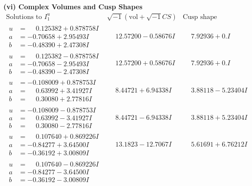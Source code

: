 \documentclass[1p]{elsarticle_modified}
\theoremstyle{definition}
\newcommand{\I}{\sqrt{-1}}
\begin{document}
\newpage\flushleft \textbf{(vi) Complex Volumes and Cusp Shapes}
$$\begin{array}{c|c|c}  
\text{Solutions to }I^u_{1}& \I (\text{vol} + \sqrt{-1}CS) & \text{Cusp shape}\\
 \hline 
\begin{aligned}
u &= \phantom{-}0.125382 + 0.878758 I \\
a &= -0.70658 + 2.95493 I \\
b &= -0.48390 + 2.47308 I\end{aligned}
 & \phantom{-}12.57200 - 0.58676 I & \phantom{-}7.92936 + 0. I\phantom{ +0.000000I} \\ \hline\begin{aligned}
u &= \phantom{-}0.125382 - 0.878758 I \\
a &= -0.70658 - 2.95493 I \\
b &= -0.48390 - 2.47308 I\end{aligned}
 & \phantom{-}12.57200 + 0.58676 I & \phantom{-}7.92936 + 0. I\phantom{ +0.000000I} \\ \hline\begin{aligned}
u &= -0.108009 + 0.878753 I \\
a &= \phantom{-}0.63992 + 3.41927 I \\
b &= \phantom{-}0.30080 + 2.77816 I\end{aligned}
 & \phantom{-}8.44721 + 6.94338 I & \phantom{-}3.88118 - 5.23404 I \\ \hline\begin{aligned}
u &= -0.108009 - 0.878753 I \\
a &= \phantom{-}0.63992 - 3.41927 I \\
b &= \phantom{-}0.30080 - 2.77816 I\end{aligned}
 & \phantom{-}8.44721 - 6.94338 I & \phantom{-}3.88118 + 5.23404 I \\ \hline\begin{aligned}
u &= \phantom{-}0.107640 + 0.869226 I \\
a &= -0.84277 + 3.64500 I \\
b &= -0.36192 + 3.00809 I\end{aligned}
 & \phantom{-}13.1823 - 12.7067 I & \phantom{-}5.61691 + 6.76212 I \\ \hline\begin{aligned}
u &= \phantom{-}0.107640 - 0.869226 I \\
a &= -0.84277 - 3.64500 I \\
b &= -0.36192 - 3.00809 I\end{aligned}

\end{array}$$
\end{document}

